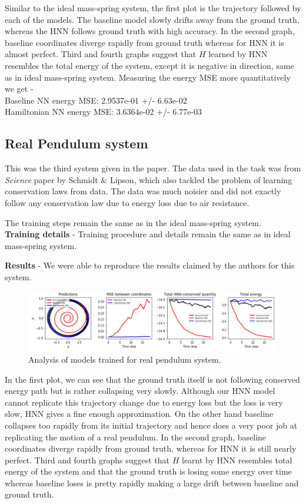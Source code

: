 Similar to the ideal mass-spring system, the first plot is the trajectory followed by each of the models. The baseline model slowly drifts away from the ground truth, whereas the HNN follows ground truth with high accuracy. In the second graph, baseline coordinates diverge rapidly from ground truth whereas for HNN it is almost perfect. Third and fourth graphs suggest that \(H\) learned by HNN resembles the total energy of the system, except it is negative in direction, same as in ideal mass-spring system.
Measuring the energy MSE more quantitatively we get -\\
Baseline NN energy MSE: 2.9537e-01 +/- 6.63e-02\\
Hamiltonian NN energy MSE: 3.6364e-02 +/- 6.77e-03

\subsection{Real Pendulum system}
This was the third system given in the paper. The data used in the task was from \textit{Science} paper by Schmidt \& Lipson, which also tackled the problem of learning conservation laws from data. The data was much noisier and did not exactly follow any conservation law due to energy loss due to air resistance.

The training steps remain the same as in the ideal mass-spring system.\\
\textbf{Training details} - Training procedure and details remain the same as in ideal mass-spring system.

\textbf{Results} - We were able to reproduce the results claimed by the authors for this system.
\begin{figure}[htp]
    \centering
    \includegraphics[width=15cm]{../openreview/real-pendulum.png}
    \caption{Analysis of models trained for real pendulum system.}
    \label{fig:galaxy}
\end{figure}

In the first plot, we can see that the ground truth itself is not following conserved energy path but is rather collapsing very slowly. Although our HNN model cannot replicate this trajectory change due to energy loss but the loss is very slow, HNN gives a fine enough approximation. On the other hand baseline collapses too rapidly from its initial trajectory and hence does a very poor job at replicating the motion of a real pendulum. In the second graph, baseline coordinates diverge rapidly from ground truth, whereas for HNN it is still nearly perfect. Third and fourth graphs suggest that \(H\) learnt by HNN resembles total energy of the system and that the ground truth is losing some energy over time whereas baseline loses is pretty rapidly making a large drift between baseline and ground truth.

